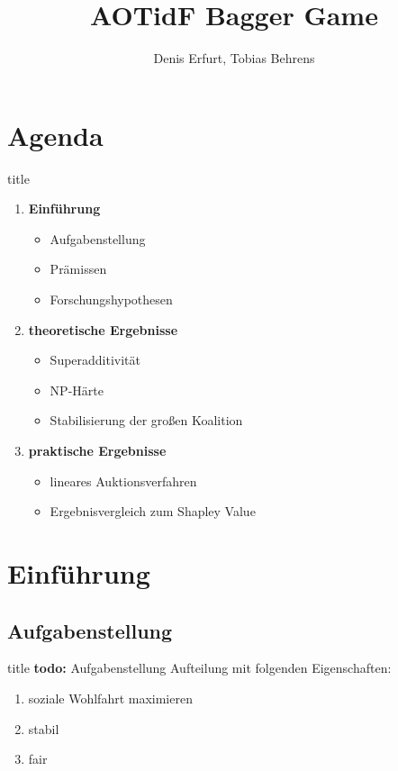 \documentclass[c]{beamer}
\title[] {AOTidF Bagger Game}
\author[Denis Erfurt, Tobias Behrens] %
{Denis Erfurt, Tobias Behrens}
\newcommand\todo[1]{\colorbox{blue!15}{\textbf{todo: }#1}\newline}
\theoremstyle{break}
\begin{document}
  \frame{\titlepage} %
  
  \section*{Agenda}
  \begin{frame}{title} %
    \begin{enumerate}
      \item \textbf{Einführung}
      \begin{itemize}
        \item Aufgabenstellung
        \item Prämissen
        \item Forschungshypothesen
      \end{itemize}
      \item \textbf{theoretische Ergebnisse}
      \begin{itemize}
        \item Superadditivität
        \item NP-Härte
        \item Stabilisierung der großen Koalition
      \end{itemize}
      \item \textbf{praktische Ergebnisse}
      \begin{itemize}
        \item lineares Auktionsverfahren
        \item Ergebnisvergleich zum Shapley Value
      \end{itemize}
    \end{enumerate}
  \end{frame}
  
  
  \section*{Einführung}
  \subsection*{Aufgabenstellung}
  \begin{frame}{title} %
    \todo{Aufgabenstellung}
    Aufteilung mit folgenden Eigenschaften:
    \begin{enumerate}
      \item soziale Wohlfahrt maximieren
      \item stabil
      \item fair
    \end{enumerate}
  \end{frame}
\end{document}
